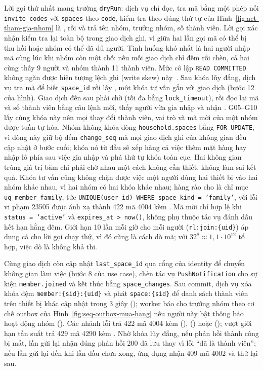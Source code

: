 
Lời gọi thứ nhất mang trường \texttt{dryRun}: dịch vụ chỉ đọc, tra mã bằng một phép nối \texttt{invite\_codes} với \texttt{spaces} theo \texttt{code}, kiểm tra theo đúng thứ tự của Hình~\ref{fig:act-tham-gia-nhom} là ,  rồi  và trả tên nhóm, trưởng nhóm, số thành viên. Lời gọi xác nhận kiểm tra lại toàn bộ trong giao dịch ghi, vì giữa hai lần gọi mã có thể bị thu hồi hoặc nhóm có thể đã đủ người. Tình huống khó nhất là hai người nhập mã cùng lúc khi nhóm còn một chỗ: nếu mỗi giao dịch chỉ đếm rồi chèn, cả hai cùng thấy 9 người và nhóm thành 11 thành viên. Mức cô lập \texttt{READ COMMITTED} không ngăn được hiện tượng lệch ghi (write skew) này~\cite{kleppmann}. Sau khóa lũy đẳng, dịch vụ tra mã để biết \texttt{space\_id} rồi lấy , một khóa tư vấn gắn với giao dịch (bước 12 của hình). Giao dịch đến sau phải chờ (tối đa bằng \texttt{lock\_timeout}), rồi đọc lại mã và số thành viên bằng câu lệnh mới, thấy người vừa gia nhập và nhận . G05--G10 lấy cùng khóa này nên mọi thay đổi thành viên, vai trò và mã mời của một nhóm được tuần tự hóa. Nhóm không khóa dòng \texttt{household.spaces} bằng \texttt{FOR UPDATE}, vì dòng này giữ bộ đếm \texttt{change\_seq} mà mọi giao dịch ghi của không gian đều cập nhật ở bước cuối; khóa nó từ đầu sẽ xếp hàng cả việc thêm mặt hàng hay nhập lô phía sau việc gia nhập và phá thứ tự khóa toàn cục. Hai không gian trùng giá trị băm chỉ phải chờ nhau một cách không cần thiết, không làm sai kết quả. Khóa tư vấn cũng không chặn được việc một người dùng hai thiết bị vào hai nhóm khác nhau, vì hai nhóm có hai khóa khác nhau; hàng rào cho  là chỉ mục \texttt{uq\_member\_family}, tức \texttt{UNIQUE(user\_id) WHERE space\_kind = 'family'}, với lỗi vi phạm 23505 được ánh xạ thành 422 mã 4004 kèm . Mã mời chỉ hợp lệ khi \texttt{status = 'active'} và \texttt{expires\_at > now()}, không phụ thuộc tác vụ đánh dấu hết hạn hằng đêm. Giới hạn 10 lần mỗi giờ cho mỗi người (\texttt{rl:join:\{uid\}}) áp dụng cả cho lời gọi chạy thử, vì đó cũng là cách dò mã; với $32^8 \approx 1{,}1 \cdot 10^{12}$ tổ hợp, việc dò là không khả thi.

Cùng giao dịch còn cập nhật \texttt{last\_space\_id} qua cổng của identity để chuyển không gian làm việc (bước 8 của use case), chèn tác vụ \texttt{PushNotification} cho sự kiện \texttt{member.joined} và kết thúc bằng \texttt{space\_changes}. Sau commit, dịch vụ xóa khóa đệm \texttt{member:\{sid\}:\{uid\}} và phát \texttt{space:\{sid\}} để danh sách thành viên trên thiết bị khác cập nhật trong 3 giây (); worker báo cho trưởng nhóm theo cơ chế outbox của Hình~\ref{fig:seq-outbox-mua-hang} nếu người này bật thông báo hoạt động nhóm (). Các nhánh lỗi trả 422 mã 4004 kèm  (),  () hoặc  (); vượt giới hạn tần suất trả 429 mã 4290 kèm . Nhờ khóa lũy đẳng, nếu phản hồi thành công bị mất, lần gửi lại nhận đúng phản hồi 200 đã lưu thay vì lỗi “đã là thành viên”; nếu lần gửi lại đến khi lần đầu chưa xong, ứng dụng nhận 409 mã 4002 và thử lại sau.

